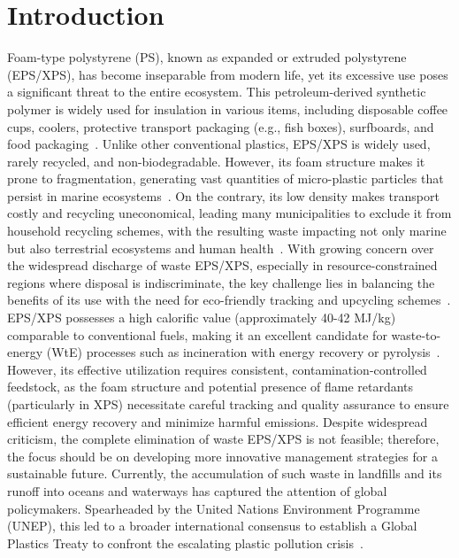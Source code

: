 \documentclass[final,5p,times,twocolumn]{elsarticle}
\begin{document}
\section{Introduction}
Foam-type polystyrene (PS), known as expanded or extruded polystyrene (EPS/XPS), has become inseparable from modern life, yet its excessive use poses a significant threat to the entire ecosystem. This petroleum-derived synthetic polymer is widely used for insulation in various items, including disposable coffee cups, coolers, protective transport packaging (e.g., fish boxes), surfboards, and food packaging~\cite{uekert2023technical}. Unlike other conventional plastics, EPS/XPS is widely used, rarely recycled, and non-biodegradable. However, its foam structure makes it prone to fragmentation, generating vast quantities of micro-plastic particles that persist in marine ecosystems~\cite{mondal2022blockchain}. On the contrary, its low density makes transport costly and recycling uneconomical, leading many municipalities to exclude it from household recycling schemes, with the resulting waste impacting not only marine but also terrestrial ecosystems and human health~\cite{ugwu2023mini}. With growing concern over the widespread discharge of waste EPS/XPS, especially in resource-constrained regions where disposal is indiscriminate, the key challenge lies in balancing the benefits of its use with the need for eco-friendly tracking and upcycling schemes~\cite{taylor2020blockchain, hossain2022full}. EPS/XPS possesses a high calorific value (approximately 40-42 MJ/kg) comparable to conventional fuels, making it an excellent candidate for waste-to-energy (WtE) processes such as incineration with energy recovery or pyrolysis~\cite{su16}. However, its effective utilization requires consistent, contamination-controlled feedstock, as the foam structure and potential presence of flame retardants (particularly in XPS) necessitate careful tracking and quality assurance to ensure efficient energy recovery and minimize harmful emissions. Despite widespread criticism, the complete elimination of waste EPS/XPS is not feasible; therefore, the focus should be on developing more innovative management strategies for a sustainable future. Currently, the accumulation of such waste in landfills and its runoff into oceans and waterways has captured the attention of global policymakers. Spearheaded by the United Nations Environment Programme (UNEP), this led to a broader international consensus to establish a Global Plastics Treaty to confront the escalating plastic pollution crisis~\cite{fry2024simulating}. 
\end{document}
